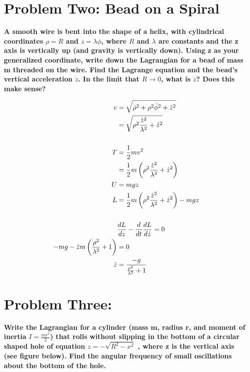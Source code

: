 \documentclass[10pt]{article} %
\begin{document}
\section{Problem Two: Bead on a Spiral}
\textbf{A smooth wire is bent into the shape of a helix, with cylindrical coordinates $\rho=R$ and $z=\lambda\phi$, where $R$ and $\lambda$ are constants and the z axis is vertically up (and gravity is vertically down). Using z as your generalized coordinate, write down the Lagrangian for a bead of mass m threaded on the wire. Find the Lagrange equation and the bead’s vertical acceleration $\ddot{z}$. In the limit that $R → 0$, what is $\ddot{z}$? Does this make sense?}

\begin{align*}
  v &= \sqrt{\dot{\rho}^2 + \rho^2\dot{\phi}^2 + \dot{z}^2}\\
  &= \sqrt{\rho^2\frac{\dot{z}^2}{\lambda^2} + \dot{z}^2}\\
  \vspace{1cm}\\
  T &= \frac{1}{2}mv^2\\
  &= \frac{1}{2}m\left(\rho^2\frac{\dot{z}^2}{\lambda^2} + \dot{z}^2\right)\\
  U &= mgz\\
  L &= \frac{1}{2}m\left(\rho^2\frac{\dot{z}^2}{\lambda^2} + \dot{z}^2\right) - mgz\\
  \vspace{1cm}\\
  &\frac{dL}{dz} - \frac{d}{dt}\frac{dL}{d\dot{z}} = 0\\
  -mg - \ddot{z}m\left(\frac{\rho^2}{\lambda^2}+1\right) &= 0\\
  \ddot{z} &= \frac{-g}{\frac{\rho^2}{\lambda^2}+1}\\
\end{align*}

\section{Problem Three: }
\textbf{Write the Lagrangian for a cylinder (mass m, radius r, and moment of inertia $I=\frac{mr^2}{2}$) that rolls without slipping in the bottom of a circular shaped hole of equation $z = −\sqrt{R^2 − x^2}$ , where z is the vertical axis (see figure below). Find the angular frequency of small oscillations about the bottom of the hole.}
\end{document}
